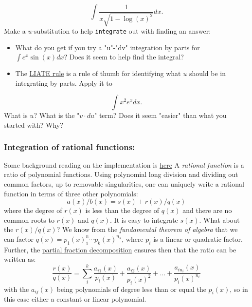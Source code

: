 \documentclass[12pt]{article}
\begin{document}
$$
\int \frac{1}{x \sqrt{1 - \log(x)^2}}dx.
$$
\newline
Make a $u$-substitution to help \texttt{integrate} out with finding an answer:\begin{itemize}\item What do you get if you try a "u"-"dv" integration by parts for $\int   e^x \sin(x) dx$?  Does it seem to help find the integral?\end{itemize}\begin{itemize}\item The \href{http://en.wikipedia.org/wiki/Integration_by_parts#LIATE_rule}{LIATE rule} is a rule of thumb for identifying what $u$ should be in integrating by parts. Apply it to \end{itemize}
$$
\int x^2 e^x dx.
$$
\newline
What is $u$? What is the "$v \cdot du$" term? Does it seem "easier" than what you started with? Why?\subsubsection{Integration of rational functions:}\newline
Some background reading on the implementation is \href{http://asmeurersympy.wordpress.com/2010/06/11/integration-of-rational-functions/}{here}\newline
A \textit{rational function} is a ratio of polynomial functions. Using polynomial long division and dividing out common factors, up to removable singularities, one can uniquely write a rational function in terms of three other polynomials:
$$
a(x)/b(x) =  s(x) + r(x)/q(x)
$$
\newline
where the degree of $r(x)$ is less than the degree of $q(x)$ and there are no common roots to $r(x)$ and $q(x)$. It is easy to integrate $s(x)$. What about the $r(x)/q(x)$?\newline
We know from the \textit{fundamental theorem of algebra} that we can factor $q(x) = p_1(x)^n_1 \cdots p_k(x)^{n_k}$, where $p_i$ is a linear or quadratic factor. Further, the \href{http://en.wikipedia.org/wiki/Partial_fraction_decomposition}{partial fraction decomposition} ensures then that the ratio can be written as:
$$
\frac{r(x)}{q(x)} = \sum_i^k \frac{a_{i1}(x)}{p_i(x)} + \frac{a_{i2}(x)}{p_i(x)^2} + ... + \frac{a_{in_i}(x)}{p_i(x)^{n_i}}
$$
\newline
with the $a_{ij}(x)$ being polynomials of degree less than or equal the $p_i(x)$, so in this case either a constant or linear polynomial.\newline
\end{document}
